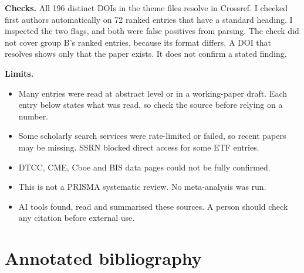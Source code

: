 \documentclass[11pt]{article}
\begin{document}
\textbf{Checks.} All 196 distinct DOIs in the theme files resolve in Crossref. I checked first authors automatically on 72 ranked entries that have a standard heading. I inspected the two flags, and both were false positives from parsing. The check did not cover group B's ranked entries, because its format differs. A DOI that resolves shows only that the paper exists. It does not confirm a stated finding.

\textbf{Limits.}
\begin{itemize}
\item Many entries were read at abstract level or in a working-paper draft. Each entry below states what was read, so check the source before relying on a number.
\item Some scholarly search services were rate-limited or failed, so recent papers may be missing. SSRN blocked direct access for some ETF entries.
\item DTCC, CME, Cboe and BIS data pages could not be fully confirmed.
\item This is not a PRISMA systematic review. No meta-analysis was run.
\item AI tools found, read and summarised these sources. A person should check any citation before external use.
\end{itemize}

\appendix
\section{Annotated bibliography}
\small

\end{document}
